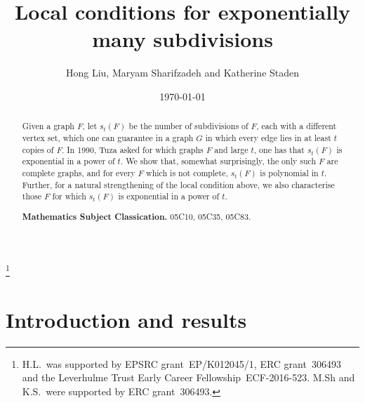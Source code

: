 \documentclass[12pt]{amsart}
\begin{document}
\def\COMMENT#1{}

\newtheorem{theorem}{Theorem}
\newtheorem{lemma}[theorem]{Lemma}
\newtheorem{proposition}[theorem]{Proposition}
\newtheorem{corollary}[theorem]{Corollary}
\newtheorem{conjecture}[theorem]{Conjecture}
\newtheorem{claim}[theorem]{Claim}
\newtheorem{definition}[theorem]{Definition}
\newtheorem{question}[theorem]{Question}



\def\eps{{\varepsilon}}
\newcommand{\cP}{\mathcal{P}}
\newcommand{\cT}{\mathcal{T}}
\newcommand{\cL}{\mathcal{L}}
\newcommand{\ex}{\mathbb{E}}
\newcommand{\eul}{e}
\newcommand{\pr}{\mathbb{P}}




\title[Local conditions for exponentially many subdivisions]{Local conditions for exponentially many subdivisions}
\author{Hong Liu, Maryam Sharifzadeh and Katherine Staden}
\thanks{H.L.\ was supported by EPSRC grant~EP/K012045/1, ERC
grant~306493 and the Leverhulme Trust
Early Career Fellowship~ECF-2016-523. M.Sh and K.S.\ were supported by ERC grant~306493.}

\begin{abstract}
Given a graph $F$, let $s_t(F)$ be the number of subdivisions of $F$, each with a different vertex set, which one can guarantee in a graph $G$ in which every edge lies in at least $t$ copies of $F$.
In 1990, Tuza asked for which graphs $F$ and large $t$, one has that $s_t(F)$ is exponential in a power of $t$.
We show that, somewhat surprisingly, the only such $F$ are complete graphs, and for every $F$ which is not complete, $s_t(F)$ is polynomial in $t$. Further, for a natural strengthening of the local condition above, we also characterise those $F$ for which $s_t(F)$ is exponential in a power of $t$.

\medskip

\noindent \textbf{Mathematics Subject Classication.} 05C10, 05C35, 05C83.
\end{abstract}




\date{\today}
\maketitle


\section{Introduction and results}
\end{document}
